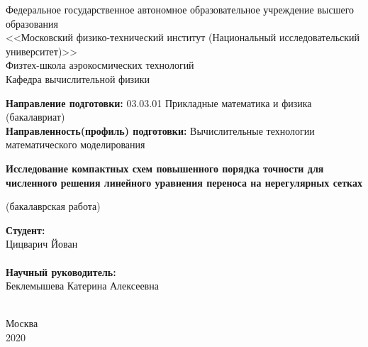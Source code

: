 \documentclass[14pt]{article}
\begin{document}
\begin{center}
\small
Федеральное государственное автономное образовательное учреждение высшего образования\\
<<Московский физико-технический институт (Национальный исследовательский университет)>> \\
Физтех-школа аэрокосмических технологий\\
Кафедра вычислительной физики
\end{center}

\begin{flushleft}
\small
\textbf{Направление подготовки:} 03.03.01 Прикладные математика и физика (бакалавриат)\\
\textbf{Направленность(профиль) подготовки:} Вычислительные технологии математического моделирования\\
\end{flushleft}

\begin{center}
\LARGE
\textbf{Исследование компактных схем повышенного порядка точности для численного решения линейного уравнения переноса на нерегулярных сетках}

\small(бакалаврская работа)
\end{center}


\begin{flushright}

\noindent
\textbf{Студент:} \\
Цицварич Йован\\
\underline{\hspace{3cm}}\\
\textbf{Научный руководитель:}\\
Беклемышева Катерина Алексеевна\\
\underline{\hspace{3cm}}\\

\end{flushright}

\begin{center}
\small
Москва\\
2020
\end{center}

\newpage
\setcounter{page}{1}
\end{document}
